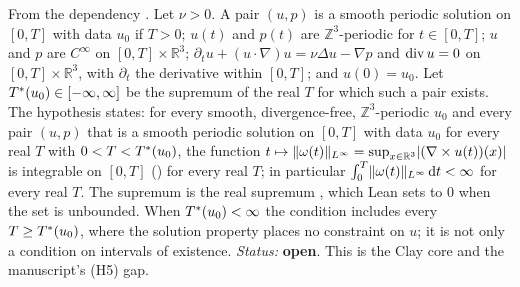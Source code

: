 \documentclass[11pt]{article}
\begin{document}
\begin{hyp}
From the dependency . Let $\nu>0$. A pair $(u,p)$ is a smooth periodic solution on $[0,T]$ with data $u_0$ if $T>0$; $u(t)$ and $p(t)$ are $\mathbb{Z}^3$-periodic for $t\in[0,T]$; $u$ and $p$ are $C^\infty$ on $[0,T]\times\mathbb{R}^3$; $\partial_t u+(u\cdot\nabla)u=\nu\Delta u-\nabla p$ and $\operatorname{div} u=0$ on $[0,T]\times\mathbb{R}^3$, with $\partial_t$ the derivative within $[0,T]$; and $u(0)=u_0$. Let $T^{*}(u_0)\in[-\infty,\infty]$ be the supremum of the real $T$ for which such a pair exists. The hypothesis states: for every smooth, divergence-free, $\mathbb{Z}^3$-periodic $u_0$ and every pair $(u,p)$ that is a smooth periodic solution on $[0,T]$ with data $u_0$ for every real $T$ with $0<T<T^{*}(u_0)$, the function $t\mapsto\lVert\omega(t)\rVert_{L^\infty}=\sup_{x\in\mathbb{R}^3}\lvert(\nabla\times u(t))(x)\rvert$ is integrable on $[0,T]$ () for every real $T$; in particular $\int_0^T\lVert\omega(t)\rVert_{L^\infty}\,\mathrm{d} t<\infty$ for every real $T$. The supremum is the real supremum , which Lean sets to $0$ when the set is unbounded. When $T^{*}(u_0)<\infty$ the condition includes every $T\ge T^{*}(u_0)$, where the solution property places no constraint on $u$; it is not only a condition on intervals of existence.
\emph{Status:} \textbf{open}. This is the Clay core and the manuscript's (H5) gap.
\end{hyp}
\end{document}
